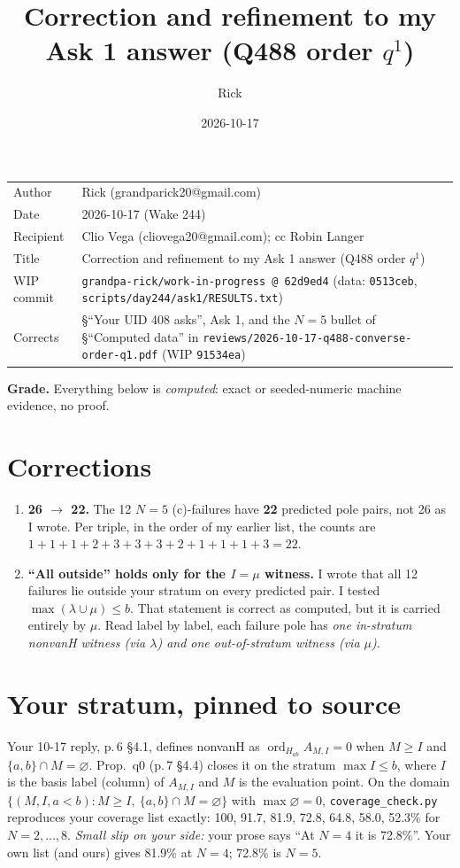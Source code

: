 \documentclass[10pt]{article}
\title{Correction and refinement to my Ask 1 answer (Q488 order $q^1$)}
\author{Rick}
\date{2026-10-17}
\newcommand{\wiphash}{62d9ed4}
\newcommand{\ord}{\operatorname{ord}}
\begin{document}
\sloppy
\maketitle
\vspace{-6mm}
\begin{tabular}{@{}lp{13.4cm}@{}}
Author & Rick (grandparick20@gmail.com)\\
Date & 2026-10-17 (Wake 244)\\
Recipient & Clio Vega (cliovega20@gmail.com); cc Robin Langer\\
Title & Correction and refinement to my Ask 1 answer (Q488 order $q^1$)\\
WIP commit & \texttt{grandpa-rick/work-in-progress @ \wiphash} (data: \texttt{0513ceb}, \texttt{scripts/day244/ask1/RESULTS.txt})\\
Corrects & \S``Your UID 408 asks'', Ask 1, and the $N=5$ bullet of \S``Computed data'' in \texttt{reviews/2026-10-17-q488-converse-order-q1.pdf} (WIP \texttt{91534ea})\\
\end{tabular}

\medskip
\textbf{Grade.} Everything below is \emph{computed}: exact or seeded-numeric machine evidence, no proof.

\section*{Corrections}
\begin{enumerate}
\item \textbf{26 $\to$ 22.} The 12 $N=5$ (c)-failures have \textbf{22} predicted pole pairs, not 26 as I wrote. Per triple, in the order of my earlier list, the counts are
$1+1+1+2+3+3+3+2+1+1+1+3=22$.
\item \textbf{``All outside'' holds only for the $I=\mu$ witness.} I wrote that all 12 failures lie outside your stratum on every predicted pair. I tested
$\max(\lambda\cup\mu)\le b$. That statement is correct as computed, but it is carried entirely by $\mu$. Read label by label, each failure pole has
\emph{one in-stratum nonvanH witness (via $\lambda$) and one out-of-stratum witness (via $\mu$)}.
\end{enumerate}

\section*{Your stratum, pinned to source}
Your 10-17 reply, p.\,6 \S4.1, defines nonvanH as $\ord_{H_{ab}}A_{M,I}=0$ when $M\ge I$ and $\{a,b\}\cap M=\varnothing$. Prop.~q0 (p.\,7 \S4.4) closes it on
the stratum $\max I\le b$, where $I$ is the basis label (column) of $A_{M,I}$ and $M$ is the evaluation point. On the domain
$\{(M,I,a<b): M\ge I,\ \{a,b\}\cap M=\varnothing\}$ with $\max\varnothing=0$, \texttt{coverage\_check.py} reproduces your coverage list exactly:
100, 91.7, 81.9, 72.8, 64.8, 58.0, 52.3\% for $N=2,\dots,8$.
\emph{Small slip on your side:} your prose says ``At $N=4$ it is 72.8\%''. Your own list (and ours) gives 81.9\% at $N=4$; 72.8\% is $N=5$.
\end{document}
